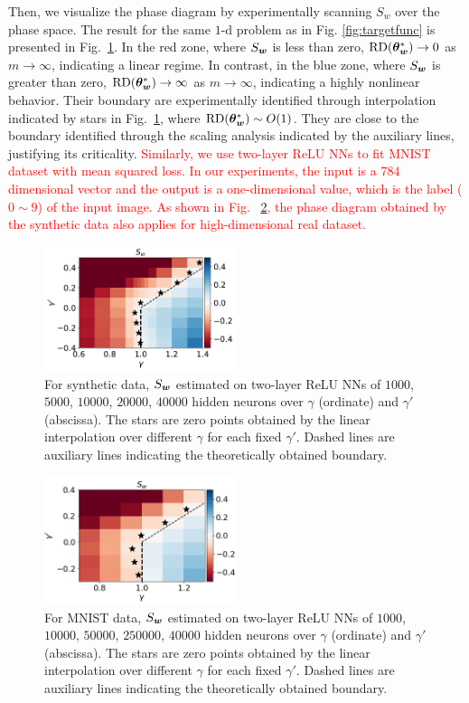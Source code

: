 \documentclass{article}
\begin{document}
Then, we visualize the phase diagram by experimentally scanning $S_w$ over the phase space. The result for the same $1$-d problem as in Fig. \ref{fig:targetfunc} is presented in Fig.~\ref{fig:wds}. In the red zone, where $S_{\bm{w}}$ is less than zero, $\mathrm{RD}(\bm{\theta}^*_{\bm{w}})\to0$ as $m\to\infty$, indicating a linear regime. In contrast, in the blue zone, where $S_{\bm{w}}$ is greater than zero, $\mathrm{RD}(\bm{\theta}^*_{\bm{w}})\to \infty$ as $m\to\infty$, indicating a highly nonlinear behavior. Their boundary are experimentally identified through interpolation indicated by stars in Fig.~\ref{fig:wds}, where $\mathrm{RD}(\bm{\theta}^*_{\bm{w}})\sim O(1)$. They are close to the boundary identified through the scaling analysis indicated by the auxiliary lines, justifying its criticality. \textcolor{red}{Similarly, we use two-layer ReLU NNs to fit MNIST dataset with mean squared loss. In our experiments, the input is a $784$ dimensional vector and the output is a one-dimensional value, which is the label ($0\sim9$) of the input image. As shown in Fig.~ \ref{fig:mnistwds}, the phase diagram obtained by the synthetic data also applies for high-dimensional real dataset. }
\begin{figure}
    \centering
    \includegraphics[width=0.5\textwidth]{pic/systemexplarg3/scalestudy3/rescale_w_slope.pdf}
    \caption{For synthetic data, $S_{\bm{w}}$ estimated on two-layer ReLU NNs of $1000$, $5000$, $10000$, $20000$, $40000$ hidden neurons over $\gamma$ (ordinate) and $\gamma'$ (abscissa). The stars are zero points obtained by the linear interpolation over different $\gamma$ for each fixed $\gamma'$. Dashed lines are auxiliary lines indicating the theoretically obtained boundary.}
    \label{fig:wds}
\end{figure}

\begin{figure}
    \centering
    \includegraphics[width=0.5\textwidth]{pic/scalestudym2/rescale_w_slope.png}
    \caption{For MNIST data, $S_{\bm{w}}$ estimated on two-layer ReLU NNs of $1000$, $10000$, $50000$, $250000$, $40000$ hidden neurons over $\gamma$ (ordinate) and $\gamma'$ (abscissa). The stars are zero points obtained by the linear interpolation over different $\gamma$ for each fixed $\gamma'$. Dashed lines are auxiliary lines indicating the theoretically obtained boundary.}
    \label{fig:mnistwds}
\end{figure}
\end{document}
